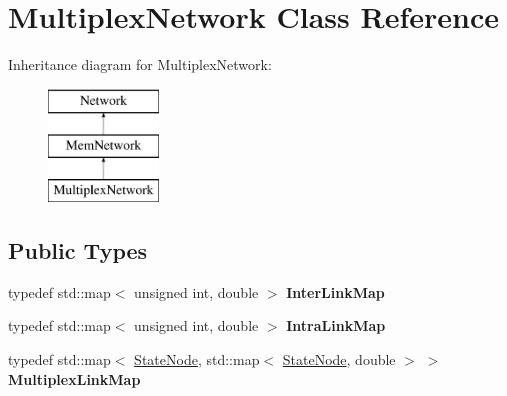 \hypertarget{classMultiplexNetwork}{}\section{Multiplex\+Network Class Reference}
\label{classMultiplexNetwork}
Inheritance diagram for Multiplex\+Network\+:\begin{figure}[H]
\begin{center}
\leavevmode
\includegraphics[height=3.000000cm]{classMultiplexNetwork}
\end{center}
\end{figure}
\subsection*{Public Types}
\begin{DoxyCompactItemize}
\item 
\mbox{\label{classMultiplexNetwork_a22f21bea1bb09c240d432eccdb3aae0f}} 
typedef std\+::map$<$ unsigned int, double $>$ {\bfseries Inter\+Link\+Map}
\item 
\mbox{\label{classMultiplexNetwork_a992053f3a42486d3561a4edd2879129d}} 
typedef std\+::map$<$ unsigned int, double $>$ {\bfseries Intra\+Link\+Map}
\item 
\mbox{\label{classMultiplexNetwork_a49c02439ac30969eb9bd095e15a8a6e1}} 
typedef std\+::map$<$ \mbox{\hyperlink{structStateNode}{State\+Node}}, std\+::map$<$ \mbox{\hyperlink{structStateNode}{State\+Node}}, double $>$ $>$ {\bfseries Multiplex\+Link\+Map}
\end{DoxyCompactItemize}
